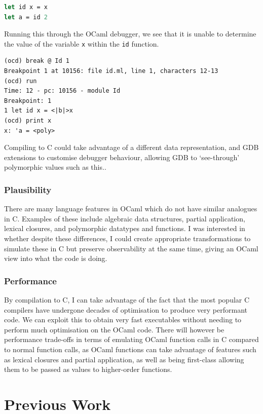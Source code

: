 \begin{lstlisting}[language=Caml]
let id x = x
let a = id 2
\end{lstlisting}

Running this through the OCaml debugger, we see that it is unable to determine
the value of the variable \texttt{x} within the \texttt{id} function.

\begin{lstlisting}
(ocd) break @ Id 1
Breakpoint 1 at 10156: file id.ml, line 1, characters 12-13
(ocd) run
Time: 12 - pc: 10156 - module Id
Breakpoint: 1
1 let id x = <|b|>x
(ocd) print x
x: 'a = <poly>
\end{lstlisting}

Compiling to C could take advantage of a different data representation, and GDB
extensions to customise debugger behaviour, allowing GDB to `see-through'
polymorphic values such as this..

\subsubsection{Plausibility} There are many language features in OCaml which do
not have similar analogues in C. Examples of these include algebraic data
structures, partial application, lexical closures, and polymorphic datatypes and
functions. I was interested in whether despite these differences, I could create
appropriate transformations to simulate these in C but preserve observability at
the same time, giving an OCaml view into what the code is doing.

\subsubsection{Performance}

By compilation to C, I can take advantage of the fact that the most popular C 
compilers have undergone decades of optimisation to produce very performant 
code. We can exploit this to obtain very fast executables without needing to 
perform much optimisation on the OCaml code. There will however be performance 
trade-offs in terms of emulating OCaml function calls in C compared to normal 
function calls, as OCaml functions can take advantage of features such as
lexical closures and partial application, as well as being first-class allowing
them to be passed as values to higher-order functions.

\section{Previous Work}

